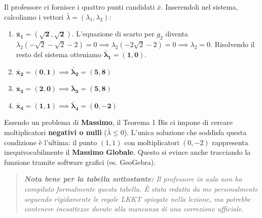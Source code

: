 \documentclass[12pt, a4paper]{article}
\begin{document}
	Il professore ci fornisce i quattro punti candidati $\bar{x}$. Inserendoli nel sistema, calcoliamo i vettori $\bar{\lambda} = (\lambda_1, \lambda_2)$:
	\begin{enumerate}
		\item $\mathbf{\bar{x}_1 = (\sqrt{2}, \sqrt{2})}$. L'equazione di scarto per $g_2$ diventa $\lambda_2(-\sqrt{2} - \sqrt{2} - 2) = 0 \implies \lambda_2(-2\sqrt{2} - 2) = 0 \implies \lambda_2 = 0$. Risolvendo il resto del sistema otteniamo $\mathbf{\bar{\lambda}_1 = (1, 0)}$.
		\item $\mathbf{\bar{x}_2 = (0, 1)} \implies \mathbf{\bar{\lambda}_2 = (5, 8)}$
		\item $\mathbf{\bar{x}_3 = (2, 0)} \implies \mathbf{\bar{\lambda}_3 = (5, 8)}$
		\item $\mathbf{\bar{x}_4 = (1, 1)} \implies \mathbf{\bar{\lambda}_4 = (0, -2)}$
	\end{enumerate}
	
	Essendo un problema di \textbf{Massimo}, il Teorema 1 Bis ci impone di cercare moltiplicatori \textbf{negativi o nulli} ($\bar{\lambda} \le 0$). 
	L'unica soluzione che soddisfa questa condizione è l'ultima: il punto $(1,1)$ con moltiplicatori $(0,-2)$ rappresenta inequivocabilmente il \textbf{Massimo Globale}. Questo si evince anche tracciando la funzione tramite software grafici (es. GeoGebra).
	
	\begin{quote}
		\textit{\textbf{Nota bene per la tabella sottostante:} Il professore in aula non ha compilato formalmente questa tabella. È stata redatta da me personalmente seguendo rigidamente le regole LKKT spiegate nella lezione, ma potrebbe contenere inesattezze dovute alla mancanza di una correzione ufficiale.}
	\end{quote}
	
\end{document}

